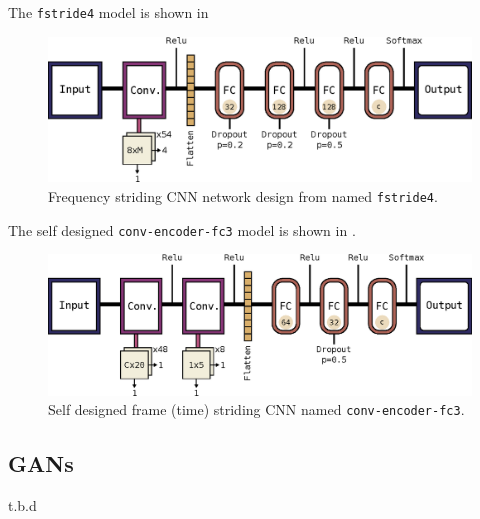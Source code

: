 The \texttt{fstride4} model is shown in 
\begin{figure}[!ht]
  \centering
    \includegraphics[height=0.2\textwidth]{./4_nn/figs/nn_arch_cnn_fstride.eps}
  \caption{Frequency striding CNN network design from \cite{Sainath2015} named \texttt{fstride4}.}
  \label{fig:nn_arch_cnn_fstride}
\end{figure}
\FloatBarrier
\noindent

The self designed \texttt{conv-encoder-fc3} model is shown in .
\begin{figure}[!ht]
  \centering
    \includegraphics[height=0.2\textwidth]{./4_nn/figs/nn_arch_cnn_conv-encoder-fc3.eps}
  \caption{Self designed frame (time) striding CNN named \texttt{conv-encoder-fc3}.}
  \label{fig:nn_arch_cnn_conv-encoder-fc3}
\end{figure}
\FloatBarrier
\noindent



\subsection{GANs}\label{sec:nn_arch_gan}
t.b.d
%
%


